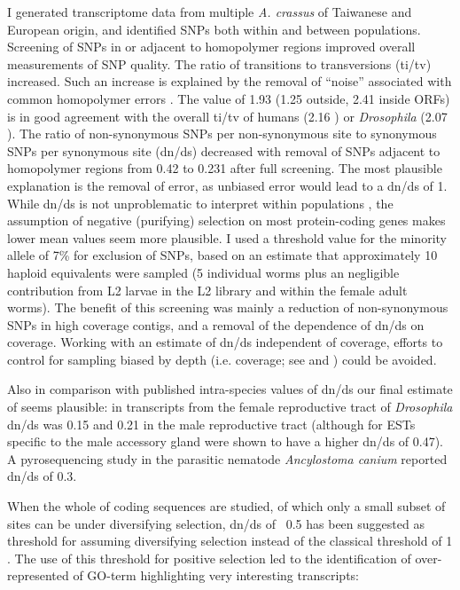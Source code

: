I generated transcriptome data from multiple \textit{A. crassus} of
Taiwanese and European origin, and identified SNPs both within and
between populations. Screening of SNPs in or adjacent to homopolymer
regions improved overall measurements of SNP quality. The ratio of
transitions to transversions (ti/tv) increased. Such an increase is
explained by the removal of ``noise'' associated with common homopolymer
errors \cite{pmid21685085}. The value of 1.93 (1.25 outside, 2.41
inside ORFs) is in good agreement with the overall ti/tv of humans
(2.16 \cite{pmid21169219}) or \textit{Drosophila} (2.07
\cite{pmid21143862}). The ratio of non-synonymous SNPs per
non-synonymous site to synonymous SNPs per synonymous site (dn/ds)
decreased with removal of SNPs adjacent to homopolymer regions from
0.42 to 0.231 after full screening. The most plausible explanation is
the removal of error, as unbiased error would lead to a dn/ds of
1. While dn/ds is not unproblematic to interpret within populations
\cite{pmid19081788}, the assumption of negative (purifying) selection
on most protein-coding genes makes lower mean values seem more
plausible. I used a threshold value for the minority allele of 7\%
for exclusion of SNPs, based on an estimate that approximately 10
haploid equivalents were sampled (5 individual worms plus an
negligible contribution from L2 larvae in the L2 library and within
the female adult worms). The benefit of this screening was mainly a
reduction of non-synonymous SNPs in high coverage contigs, and a
removal of the dependence of dn/ds on coverage. Working with an
estimate of dn/ds independent of coverage, efforts to control for
sampling biased by depth (i.e. coverage; see \cite{pmid18590545} and
\cite{pmid20478048}) could be avoided.

Also in comparison with published intra-species values of dn/ds our
final estimate of seems plausible: in transcripts from the female
reproductive tract of \textit{Drosophila} dn/ds was 0.15
\cite{pmid15579698} and 0.21 in the male reproductive tract
\cite{pmid11404480} (although for ESTs specific to the male accessory
gland were shown to have a higher dn/ds of 0.47). A pyrosequencing
study in the parasitic nematode \textit{Ancylostoma canium}
\cite{pmid20470405} reported dn/ds of 0.3.

When the whole of coding sequences are studied, of which only a small
subset of sites can be under diversifying selection, dn/ds of ~0.5 has
been suggested as threshold for assuming diversifying selection
\cite{pmid15579698} instead of the classical threshold of 1
\cite{pmid6449605}. The use of this threshold for positive selection
led to the identification of over-represented of GO-term highlighting
very interesting transcripts:

